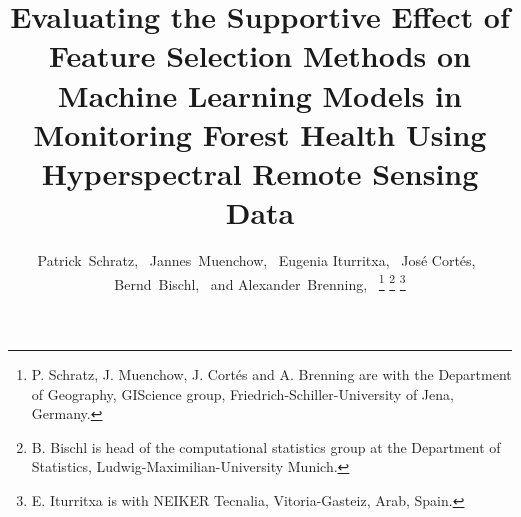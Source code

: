 \documentclass[letterpaper, peerreview]{IEEEtran}
\begin{document}
%
\title{Evaluating the Supportive Effect of Feature Selection Methods on Machine Learning Models in Monitoring Forest Health Using Hyperspectral Remote Sensing Data}
%
%
%


\author{Patrick~Schratz,~
	Jannes~Muenchow,~
	Eugenia Iturritxa,~
	José Cortés,~
	Bernd~Bischl,~
	and Alexander~Brenning,~
	\thanks{P. Schratz, J. Muenchow, J. Cortés and A. Brenning are with the Department
		of Geography, GIScience group, Friedrich-Schiller-University of Jena, Germany.}%
	\thanks{B. Bischl is head of the computational statistics group at the Department of Statistics, Ludwig-Maximilian-University Munich.}%
	\thanks{E. Iturritxa is with NEIKER Tecnalia, Vitoria-Gasteiz, Arab, Spain.}%
}

%
%
\end{document}
